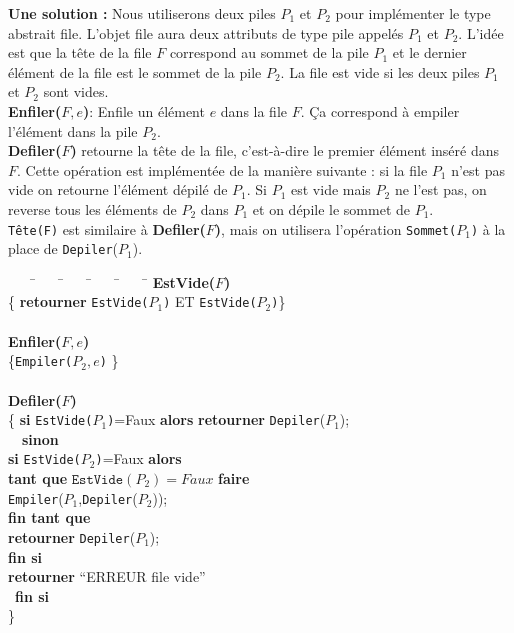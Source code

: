 \documentclass[10pt,a4paper]{article}
\begin{document}
\begin{tcolorbox} 
\textbf{Une solution :} Nous utiliserons deux piles $P_1$ et $P_2$ pour implémenter le type abstrait file. L'objet file aura deux attributs de type pile appelés $P_1$ et $P_2$.
L'idée est que la tête de la file $F$ correspond au sommet de la pile $P_1$ et le dernier élément de la file est le sommet de la pile $P_2$. La file est vide si les deux piles $P_1$ et $P_2$ sont vides. 
\\ \textbf{Enfiler($F,e$)}: Enfile un élément $e$ dans la file $F$. Ça correspond à empiler l'élément dans la pile $P_2$. \\ 
\textbf{Defiler($F$)} retourne la tête de la file, c'est-à-dire le premier élément inséré dans $F$. Cette opération est implémentée de la manière suivante : si la file $P_1$ n'est pas vide on retourne l'élément dépilé de $P_1$. Si $P_1$ est vide mais $P_2$ ne l'est pas, on reverse tous les éléments de $P_2$ dans $P_1$ et on dépile le sommet de $P_1$. \\
\texttt{Tête(F)} est similaire à \textbf{Defiler($F$)}, mais on utilisera l'opération \texttt{Sommet($P_1$)} à la place de \texttt{Depiler}($P_1$).
 
\begin{tabbing}
	~~~~\=~~~~\=~~~~\=~~~~\=~~~~\=\kill
	\textbf{EstVide($F$)}\\
	 \{ \textbf{retourner} \texttt{EstVide($P_1$)} ET \texttt{EstVide($P_2$)}\} 
        \\
     \\
       \textbf{Enfiler($F,e$)}\\
 \{\texttt{Empiler($P_2,e$)} \} \\
	 \\ 
	
  \textbf{Defiler($F$)}\\
    \{ \textbf{si} \texttt{EstVide($P_1$)}=Faux \textbf{alors} \textbf{retourner} \texttt{Depiler}($P_1$);\\
       \ \ \textbf{sinon} \\
           \> \textbf{si} \texttt{EstVide($P_2$)}=Faux \textbf{alors} \\
        \> \> \textbf{tant que} $\texttt{EstVide}(P_2)=Faux$ \textbf{faire}\\
       \> \> \>  \texttt{Empiler}($P_1$,\texttt{Depiler}($P_2$));\\
        \> \> \textbf{fin tant que}\\
         \> \>  \textbf{retourner} \texttt{Depiler}($P_1$);\\
          \> \textbf{fin si}\\
           \> \textbf{retourner} ``ERREUR file vide'' \\
          \ \textbf{fin si} \\
        \} 
\end{tabbing}
\end{tcolorbox}
\end{document}
